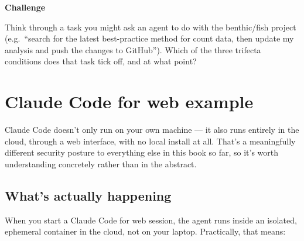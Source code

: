 \documentclass[
  letterpaper,
  DIV=11,
  numbers=noendperiod]{scrreprt}
\begin{document}
\begin{tcolorbox}[enhanced jigsaw, toprule=.15mm, rightrule=.15mm, left=2mm, leftrule=.75mm, breakable, opacityback=0, arc=.35mm, colframe=quarto-callout-important-color-frame, bottomrule=.15mm, colback=white]
\begin{minipage}[t]{5.5mm}
\textcolor{quarto-callout-important-color}{\faExclamation}
\end{minipage}%
\begin{minipage}[t]{\textwidth - 5.5mm}

\vspace{-3mm}\textbf{Challenge}\vspace{3mm}

Think through a task you might ask an agent to do with the benthic/fish
project (e.g.~``search for the latest best-practice method for count
data, then update my analysis and push the changes to GitHub''). Which
of the three trifecta conditions does that task tick off, and at what
point?

\end{minipage}%
\end{tcolorbox}

\chapter{Claude Code for web example}\label{claude-code-for-web-example}

Claude Code doesn't only run on your own machine --- it also runs
entirely in the cloud, through a web interface, with no local install at
all. That's a meaningfully different security posture to everything else
in this book so far, so it's worth understanding concretely rather than
in the abstract.

\section{What's actually happening}\label{whats-actually-happening}

When you start a Claude Code for web session, the agent runs inside an
isolated, ephemeral container in the cloud, not on your laptop.
Practically, that means:
\end{document}
